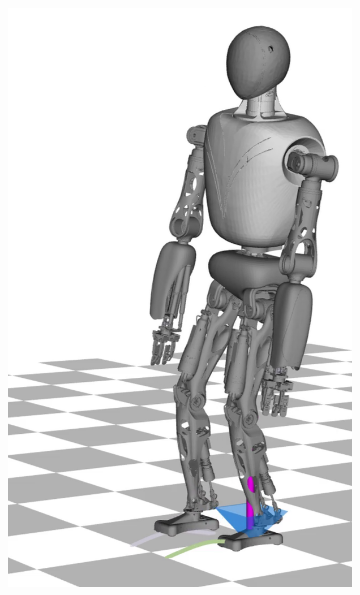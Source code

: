 \begin{figure}
\begin{subfigure}{.16\textwidth}
	\includegraphics[width=1\linewidth]{fig/walkDynamic/snaps/3}
	\caption{}
\end{subfigure}%
\begin{subfigure}{.16\textwidth}

\end{subfigure}
\end{figure}
